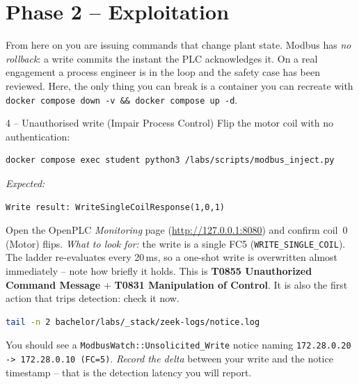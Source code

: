 \documentclass[11pt,a4paper]{article}
\begin{document}
\section*{Phase 2 -- Exploitation}

\begin{warnbox}
From here on you are issuing commands that change plant state. Modbus
has \emph{no rollback}: a write commits the instant the PLC
acknowledges it. On a real engagement a process engineer is in the loop
and the safety case has been reviewed. Here, the only thing you can
break is a container you can recreate with \texttt{docker compose down -v
\&\& docker compose up -d}.
\end{warnbox}

\begin{stepbox}{4 -- Unauthorised write (Impair Process Control)}
Flip the motor coil with no authentication:
\begin{lstlisting}[language=bash]
docker compose exec student python3 /labs/scripts/modbus_inject.py
\end{lstlisting}
\textit{Expected:}
\begin{lstlisting}
Write result: WriteSingleCoilResponse(1,0,1)
\end{lstlisting}
Open the OpenPLC \emph{Monitoring} page (\url{http://127.0.0.1:8080})
and confirm coil~0 (Motor) flips. \textit{What to look for:} the write
is a single FC5 (\texttt{WRITE\_SINGLE\_COIL}). The ladder re-evaluates
every 20\,ms, so a one-shot write is overwritten almost immediately --
note how briefly it holds. This is
\textbf{T0855 Unauthorized Command Message} +
\textbf{T0831 Manipulation of Control}. It is also the first action
that trips detection: check it now.
\begin{lstlisting}[language=bash]
tail -n 2 bachelor/labs/_stack/zeek-logs/notice.log
\end{lstlisting}
You should see a \texttt{ModbusWatch::Unsolicited\_Write} notice
naming \texttt{172.28.0.20 -> 172.28.0.10 (FC=5)}. \emph{Record the
delta} between your write and the notice timestamp -- that is the
detection latency you will report.
\end{stepbox}
\end{document}
